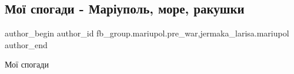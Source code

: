  
 
 
 
 

\subsection{Мої спогади - Маріуполь, море, ракушки}
\label{sec:23_01_2023.fb.fb_group.mariupol.pre_war.1.mo__spogadi___mar_up}
 
\ifcmt
 author_begin
   author_id fb_group.mariupol.pre_war,jermaka_larisa.mariupol
 author_end
\fi

Мої спогади
